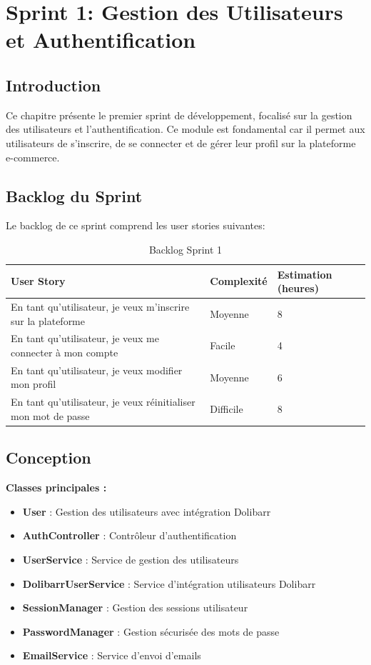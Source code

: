 \documentclass[12pt,a4paper]{report}
\begin{document}
\chapter{Sprint 1: Gestion des Utilisateurs et Authentification}
\section{Introduction}
Ce chapitre présente le premier sprint de développement, focalisé sur la gestion des utilisateurs et l'authentification. Ce module est fondamental car il permet aux utilisateurs de s'inscrire, de se connecter et de gérer leur profil sur la plateforme e-commerce.

\section{Backlog du Sprint}
Le backlog de ce sprint comprend les user stories suivantes:

\begin{table}[H]
\centering
\begin{tabularx}{\textwidth}{|X|X|X|}
\hline
\textbf{User Story} & \textbf{Complexité} & \textbf{Estimation (heures)} \\
\hline
En tant qu'utilisateur, je veux m'inscrire sur la plateforme & Moyenne & 8 \\
\hline
En tant qu'utilisateur, je veux me connecter à mon compte & Facile & 4 \\
\hline
En tant qu'utilisateur, je veux modifier mon profil & Moyenne & 6 \\
\hline
En tant qu'utilisateur, je veux réinitialiser mon mot de passe & Difficile & 8 \\
\hline
\end{tabularx}
\caption{Backlog Sprint 1}
\label{tab:sprint1_backlog}
\end{table}

\section{Conception}


\textbf{Classes principales :}
\begin{itemize}
\item \textbf{User} : Gestion des utilisateurs avec intégration Dolibarr
\item \textbf{AuthController} : Contrôleur d'authentification
\item \textbf{UserService} : Service de gestion des utilisateurs
\item \textbf{DolibarrUserService} : Service d'intégration utilisateurs Dolibarr
\item \textbf{SessionManager} : Gestion des sessions utilisateur
\item \textbf{PasswordManager} : Gestion sécurisée des mots de passe
\item \textbf{EmailService} : Service d'envoi d'emails
\end{itemize}
\end{document}
